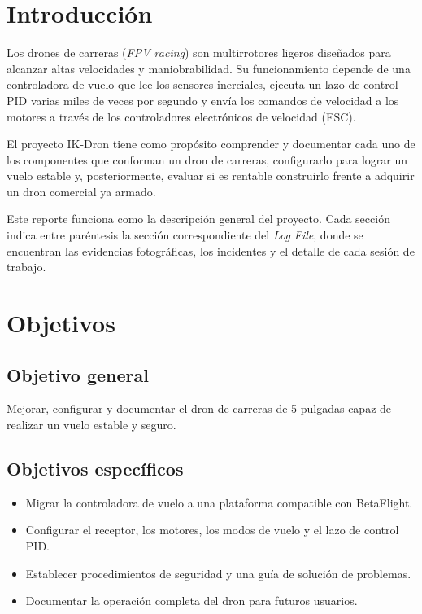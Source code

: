 \documentclass[11pt,letterpaper]{article}
\begin{document}
\tableofcontents
\newpage

\section{Introducción}
Los drones de carreras (\textit{FPV racing}) son multirrotores ligeros diseñados para alcanzar altas velocidades y maniobrabilidad. Su funcionamiento depende de una controladora de vuelo que lee los sensores inerciales, ejecuta un lazo de control PID varias miles de veces por segundo y envía los comandos de velocidad a los motores a través de los controladores electrónicos de velocidad (ESC).

El proyecto IK-Dron tiene como propósito comprender y documentar cada uno de los componentes que conforman un dron de carreras, configurarlo para lograr un vuelo estable y, posteriormente, evaluar si es rentable construirlo frente a adquirir un dron comercial ya armado.

Este reporte funciona como la descripción general del proyecto. Cada sección indica entre paréntesis la sección correspondiente del \textit{Log File}, donde se encuentran las evidencias fotográficas, los incidentes y el detalle de cada sesión de trabajo.

\section{Objetivos}
\subsection{Objetivo general}
Mejorar, configurar y documentar el dron de carreras de 5 pulgadas capaz de realizar un vuelo estable y seguro.

\subsection{Objetivos específicos}
\begin{itemize}[nosep]
    \item Migrar la controladora de vuelo a una plataforma compatible con BetaFlight.
    \item Configurar el receptor, los motores, los modos de vuelo y el lazo de control PID.
    \item Establecer procedimientos de seguridad y una guía de solución de problemas.
    \item Documentar la operación completa del dron para futuros usuarios.
\end{itemize}
\end{document}
